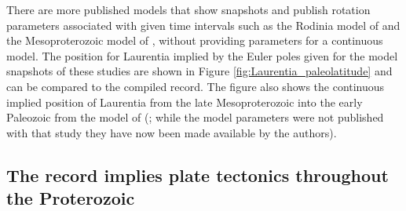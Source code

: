 \documentclass[11pt,letterpaper]{article}
\begin{document}
There are more published models that show snapshots and publish rotation parameters associated with given time intervals such as the Rodinia model of \cite{Li2008a} and the Mesoproterozoic model of \cite{Pisarevsky2014b}, without providing parameters for a continuous model. The position for Laurentia implied by the Euler poles given for the model snapshots of these studies are shown in Figure \ref{fig:Laurentia_paleolatitude} and can be compared to the compiled record. The figure also shows the continuous implied position of Laurentia from the late Mesoproterozoic into the early Paleozoic from the model of (\citealp{Li2013a}; while the model parameters were not published with that study they have now been made available by the authors).

\subsection{The record implies plate tectonics throughout the Proterozoic}
\end{document}
